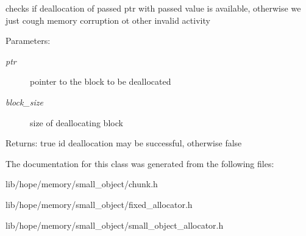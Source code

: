 checks if deallocation of passed ptr with passed value is available, otherwise we just cough memory corruption ot other invalid activity 

\begin{Desc}
\item[Parameters:]
\begin{description}
\item[{\em ptr}]pointer to the block to be deallocated \item[{\em block\_\-size}]size of deallocating block \end{description}
\end{Desc}
\begin{Desc}
\item[Returns:]true id deallocation may be successful, otherwise false \end{Desc}


The documentation for this class was generated from the following files:\begin{CompactItemize}
\item 
lib/hope/memory/small\_\-object/chunk.h\item 
lib/hope/memory/small\_\-object/fixed\_\-allocator.h\item 
lib/hope/memory/small\_\-object/small\_\-object\_\-allocator.h\end{CompactItemize}
